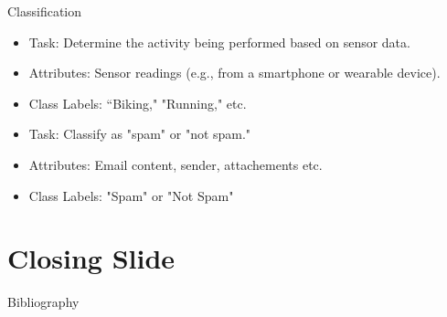 \documentclass[aspectratio=169]{beamer}
\begin{document}
\begin{frame}{Classification}
\begin{minipage}[t]{0.32\textwidth}
        \begin{coloredblock}
            \begin{itemize}
                \item \scriptsize Task: Determine the activity being performed based on sensor data.
                \item \scriptsize Attributes: Sensor readings (e.g., from a smartphone or wearable device).
                \item \scriptsize Class Labels: “Biking," "Running," etc.
            \end{itemize}
        \end{coloredblock}
        \vspace{0.3cm}
        \begin{coloredblock}
            \begin{itemize}
                \item \scriptsize Task: Classify as "spam" or "not spam."
                \item \scriptsize Attributes: Email content, sender, attachements etc.
                \item \scriptsize Class Labels: "Spam" or "Not Spam"
            \end{itemize}
        \end{coloredblock}
        
    \end{minipage}

\end{frame}


\section*{Closing Slide}

\begin{frame}
    \label{frame:closing_slide}

\end{frame}


\begin{frame}[allowframebreaks]{Bibliography}
  \printbibliography
\end{frame}
\end{document}
